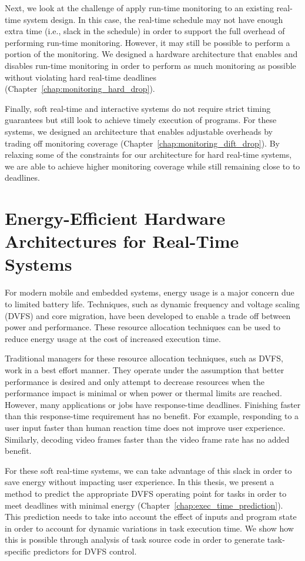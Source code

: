Next, we look at the challenge of apply run-time monitoring to an existing
real-time system design. In this case, the real-time schedule may not have
enough extra time (i.e., slack in the schedule) in order to support the
full overhead of performing run-time monitoring. However, it may still be possible
to perform a portion of the monitoring. We designed a hardware architecture
that enables and disables run-time monitoring in order to perform as much
monitoring as possible without violating hard real-time deadlines
(Chapter~\ref{chap:monitoring_hard_drop}).

Finally, soft real-time and interactive systems do not require strict timing guarantees
but still look to achieve timely execution of programs. For these systems, we designed an
architecture that enables adjustable overheads by trading off monitoring coverage
(Chapter~\ref{chap:monitoring_dift_drop}). By relaxing some of the constraints
for our architecture for hard real-time systems, we are able to achieve higher
monitoring coverage while still remaining close to to deadlines.

\section{Energy-Efficient Hardware Architectures for Real-Time Systems}
\label{sec:intro.energy}

For modern mobile and embedded systems, energy usage is a major concern due to
limited battery life. Techniques, such as dynamic frequency and voltage scaling
(DVFS) and core migration, have been developed to enable a trade off
between power and performance. These resource allocation techniques can be used
to reduce energy usage at the cost of increased execution time.

Traditional managers for these resource allocation techniques, such as DVFS,
work in a best effort manner. They operate under the assumption that better
performance is desired and only attempt to decrease resources when the
performance impact is minimal or when power or thermal limits are reached.
However, many applications or jobs have
response-time deadlines. Finishing faster than this response-time
requirement has no benefit. For example, responding to a user input faster than
human reaction time does not improve user experience. Similarly, decoding video
frames faster than the video frame rate has no added benefit. 

For these soft real-time systems, we can take advantage of this slack in order
to save energy without impacting user experience. In this thesis, we present a
method to predict the appropriate DVFS operating point for tasks in order to
meet deadlines with minimal energy (Chapter~\ref{chap:exec_time_prediction}).
This prediction needs to take into account the effect of inputs and program
state in order to account for dynamic variations in task execution time. We
show how this is possible through analysis of task source code in order
to generate task-specific predictors for DVFS control.

